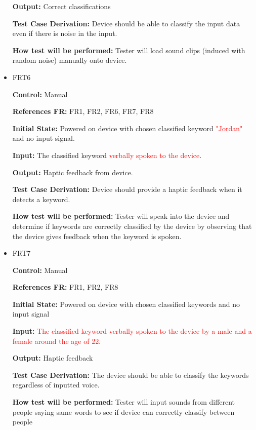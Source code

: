 \documentclass[12pt, titlepage]{article}
\begin{document}
\begin{itemize}
\textbf{Output:} Correct classifications

\textbf{Test Case Derivation:} Device should be able to classify the input data even if there is noise in the input.
					
\textbf{How test will be performed:} Tester will load sound clips (induced with random noise) manually onto device. 


\item{FRT6}

\textbf{Control:} Manual

\textbf{References FR:} FR1, FR2, FR6, FR7, FR8 					

\textbf{Initial State:} Powered on device with chosen classified keyword  \textcolor{red}{"Jordan"} and no input signal. 
					
\textbf{Input:} The classified keyword \textcolor{red}{verbally spoken to the device}.
					
\textbf{Output:} Haptic feedback from device. 

\textbf{Test Case Derivation:} Device should provide a haptic feedback when it detects a keyword.
					
\textbf{How test will be performed:} Tester will speak into the device and determine if keywords are correctly classified by the device by observing that the device gives feedback when the keyword is spoken.


\item{FRT7}

\textbf{Control:} Manual

\textbf{References FR:} FR1, FR2, FR8 					

\textbf{Initial State:} Powered on device with chosen classified keywords and no input signal 
					
\textbf{Input:}  \textcolor{red}{The classified keyword verbally spoken to the device by a male and a female around the age of 22}.
					
\textbf{Output:} Haptic feedback

\textbf{Test Case Derivation:} The device should be able to classify the keywords regardless of inputted voice.
					
\textbf{How test will be performed:} Tester will input sounds from different people saying same words to see if device can correctly classify between people 


\end{itemize}
\end{document}
